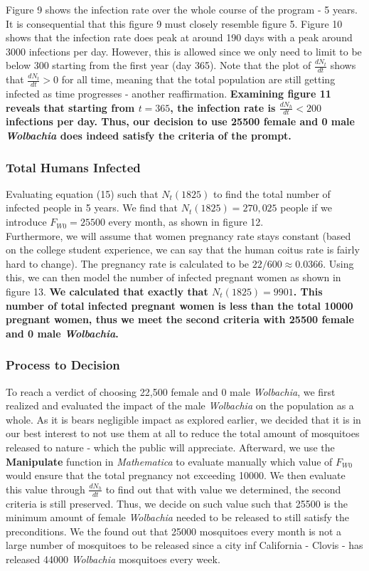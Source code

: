 \documentclass{article}
\begin{document}
Figure 9 shows the infection rate over the whole course of the program - 5 years. It is consequential that this figure 9 must closely resemble figure 5. Figure 10 shows that the infection rate does peak at around 190 days with a peak around 3000 infections per day. However, this is allowed since we only need to limit to be below 300 starting from the first year (day 365). Note that the plot of $\frac{dN_t}{dt}$ shows that $\frac{dN_t}{dt}>0$ for all time, meaning that the total population are still getting infected as time progresses - another reaffirmation. \textbf{Examining figure 11 reveals that starting from $t=365$, the infection rate is $\frac{dN_h}{dt}<200$ infections per day. Thus, our decision to use 25500 female and 0 male \textit{Wolbachia} does indeed satisfy the criteria of the prompt.}

\subsubsection{Total Humans Infected}

Evaluating equation (15) such that $N_t(1825)$ to find the total number of infected people in 5 years. We find that $N_t(1825)=270,025$ people if we introduce $F_{W0}=25500$ every month, as shown in figure 12.\\

Furthermore, we will assume that women pregnancy rate stays constant (based on the college student experience, we can say that the human coitus rate is fairly hard to change). The pregnancy rate is calculated to be $22/600\approx0.0366$. Using this, we can then model the number of infected pregnant women as shown in figure 13. \textbf{We calculated that exactly that $N_t(1825)=9901$. This number of total infected pregnant women is less than the total 10000 pregnant women, thus we meet the second criteria with 25500 female and 0 male \textit{Wolbachia}.}

\subsubsection{Process to Decision}

To reach a verdict of choosing 22,500 female and 0 male \textit{Wolbachia}, we first realized and evaluated the impact of the male \textit{Wolbachia} on the population as a whole. As it is bears negligible impact as explored earlier, we decided that it is in our best interest to not use them at all to reduce the total amount of mosquitoes released to nature - which the public will appreciate. Afterward, we use the \textbf{Manipulate} function in \textit{Mathematica} to evaluate manually which value of $F_{W0}$ would ensure that the total pregnancy not exceeding 10000. We then evaluate this value through $\frac{dN_h}{dt}$ to find out that with value we determined, the second criteria is still preserved. Thus, we decide on such value such that 25500 is the minimum amount of female \textit{Wolbachia} needed to be released to still satisfy the preconditions. We the found out that 25000 mosquitoes every month is not a large number of mosquitoes to be released since a city inf California - Clovis - has released 44000 \textit{Wolbachia} mosquitoes every week.
\end{document}
